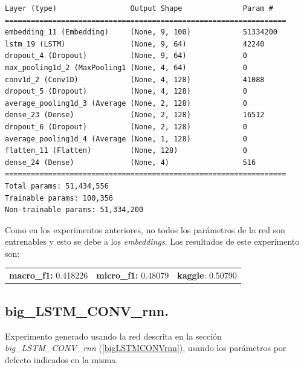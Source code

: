 \documentclass[11pt]{article}
\begin{document}
\begin{verbatim}
Layer (type)                 Output Shape              Param #   
=================================================================
embedding_11 (Embedding)     (None, 9, 100)            51334200  
lstm_19 (LSTM)               (None, 9, 64)             42240     
dropout_4 (Dropout)          (None, 9, 64)             0         
max_pooling1d_2 (MaxPooling1 (None, 4, 64)             0         
conv1d_2 (Conv1D)            (None, 4, 128)            41088     
dropout_5 (Dropout)          (None, 4, 128)            0         
average_pooling1d_3 (Average (None, 2, 128)            0         
dense_23 (Dense)             (None, 2, 128)            16512     
dropout_6 (Dropout)          (None, 2, 128)            0         
average_pooling1d_4 (Average (None, 1, 128)            0         
flatten_11 (Flatten)         (None, 128)               0         
dense_24 (Dense)             (None, 4)                 516       
=================================================================
Total params: 51,434,556
Trainable params: 100,356
Non-trainable params: 51,334,200
\end{verbatim}

Como en los experimentos anteriores, no todos los parámetros de la red son entrenables y esto se debe a los \textit{embeddings}. Los resultados de este experimento son: 

\begin{table}[H]
\begin{tabular}{c|c|c}
\textbf{macro\_f1:} 0.418226 & \textbf{micro\_f1:} 0.48079 & \textbf{kaggle}: 0.50790
\end{tabular}
\end{table}

\subsection{big\_LSTM\_CONV\_rnn.} \label{exp_bigLSTMCONVrnn}

Experimento generado usando la red descrita en la sección \textit{big\_LSTM\_CONV\_rnn} (\ref{bigLSTMCONVrnn}), usando los parámetros por defecto indicados en la misma.
\end{document}
